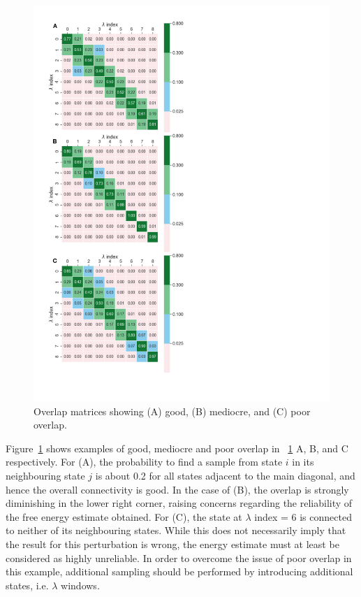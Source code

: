 \documentclass[9pt,bestpractices]{livecoms}
\begin{document}
\begin{figure}
\includegraphics[width=0.95\columnwidth]{figures/fig12_overlap/Figure.pdf}
\caption{\label{fig:overlap}Overlap matrices showing (A) good, (B) mediocre, and (C) poor overlap.}
\end{figure}

Figure~\ref{fig:overlap} shows examples of good, mediocre and poor overlap in ~\ref{fig:overlap} A, B, and C respectively. For (A), the probability to find a sample from state $i$ in its neighbouring state $j$ is about 0.2 for all states adjacent to the main diagonal, and hence the overall connectivity is good. In the case of (B), the overlap is strongly diminishing in the lower right corner, raising concerns regarding the reliability of the free energy estimate obtained. For (C), the state at $\lambda$ index = 6 is connected to neither of its neighbouring states. While this does not necessarily imply that the result for this perturbation is wrong, the energy estimate must at least be considered as highly unreliable.
In order to overcome the issue of poor overlap in this example, additional sampling should be performed by introducing additional states, i.e. $\lambda$ windows.
\end{document}
